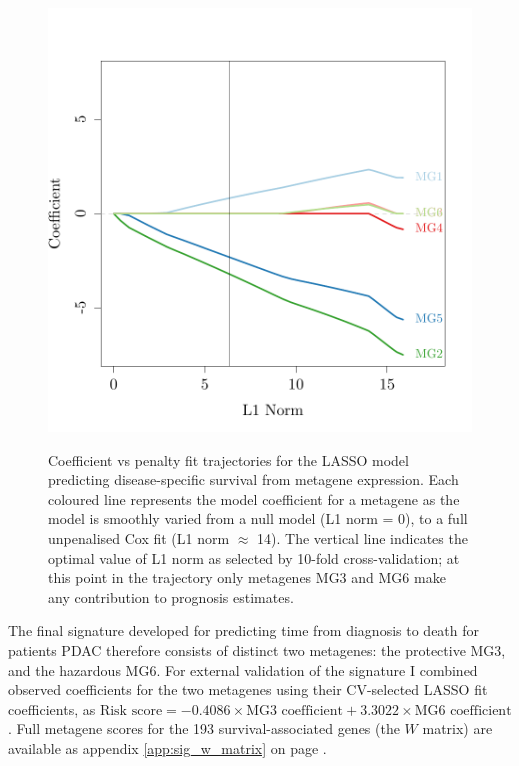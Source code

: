 \documentclass[dissertation.tex]{subfiles}
\begin{document}
\begin{figure}
\centering
\includegraphics[width=.7\linewidth]{analysis/biosurv/reports/18_SIS_diag_dsd_final/figure/nmf-metagene-glmnet-plots-2}
\label{fig:sig_resub_lasso_track}
\caption{Coefficient vs penalty fit trajectories for the \acrshort{LASSO} model predicting disease-specific survival from metagene expression.  Each coloured line represents the model coefficient for a metagene as the model is smoothly varied from a null model (L1 norm = 0), to a full unpenalised Cox fit (L1 norm $\approx$ 14).  The vertical line indicates the optimal value of L1 norm as selected by 10-fold cross-validation; at this point in the trajectory only metagenes MG3 and MG6 make any contribution to prognosis estimates.}
\end{figure}

The final signature developed for predicting time from diagnosis to death for patients \gls{PDAC} therefore consists of distinct two metagenes: the protective MG3, and the hazardous MG6.  For external validation of the signature I combined observed coefficients for the two metagenes using their CV-selected \gls{LASSO} fit coefficients, as $\text{Risk score} = -0.4086 \times \text{MG3 coefficient} + 3.3022 \times \text{MG6 coefficient}$.  Full metagene scores for the 193 survival-associated genes (the $W$ matrix) are available as appendix \ref{app:sig_w_matrix} on page \pageref{app:sig_w_matrix}. 
\end{document}
